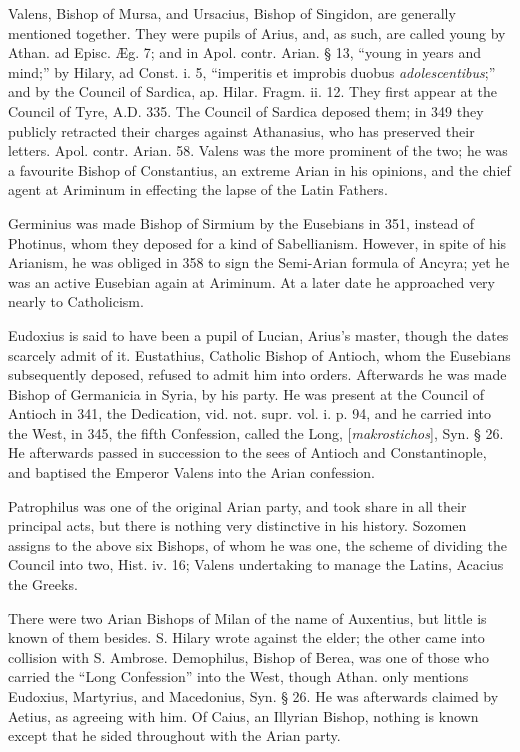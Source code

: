 Valens, Bishop of Mursa, and Ursacius, Bishop of
Singidon, are generally mentioned together. They were pupils of
Arius, and, as such, are called young by Athan. ad Episc. Æg. 7; and
in Apol. contr. Arian. § 13, ``young in years and mind;'' by Hilary, ad
Const. i. 5, ``imperitis et improbis duobus \emph{adolescentibus};'' and
by the Council of Sardica, ap. Hilar. Fragm. ii. 12. They first appear
at the Council of Tyre, A.D.
335. The Council of Sardica deposed them; in 349 they publicly
retracted their charges against Athanasius, who has preserved their
letters. Apol. contr. Arian. 58. Valens was the more prominent of the
two; he was a favourite Bishop of Constantius, an extreme Arian in his
opinions, and the chief agent at Ariminum in effecting the lapse of
the Latin Fathers.

Germinius was made Bishop of Sirmium by the
Eusebians in 351, instead of Photinus, whom they deposed for a kind of
Sabellianism. However, in spite of his Arianism, he was obliged in 358
to sign the Semi-Arian formula of Ancyra; yet he was an active
Eusebian again at Ariminum. At a later date he approached very nearly
to Catholicism.

Eudoxius is said to have been a pupil of Lucian,
Arius's master, though the dates scarcely admit of it. Eustathius,
Catholic Bishop of Antioch, whom the Eusebians subsequently deposed,
refused to admit him into orders. Afterwards he was made Bishop of
Germanicia in Syria, by his party. He was present at the Council of
Antioch in 341, the Dedication, vid. not. supr. vol. i. p. 94, and he
carried into the West, in 345, the fifth Confession, called the Long,
[\emph{makrostichos}], Syn. § 26. He afterwards passed in succession
to the sees of Antioch and Constantinople, and baptised the
Emperor Valens into the Arian confession.

Patrophilus was one of the original Arian party,
and took share in all their principal acts, but there is nothing very
distinctive in his history. Sozomen assigns to the above six Bishops,
of whom he was one, the scheme of dividing the Council into two, Hist.
iv. 16; Valens undertaking to manage the Latins, Acacius the Greeks.

There were two Arian Bishops of Milan of the name
of Auxentius, but little is known of them besides. S. Hilary wrote
against the elder; the other came into collision with S. Ambrose.
Demophilus, Bishop of Berea, was one of those who carried the ``Long
Confession'' into the West, though Athan. only mentions Eudoxius,
Martyrius, and Macedonius, Syn. § 26. He was afterwards claimed by
Aetius, as agreeing with him. Of Caius, an Illyrian Bishop, nothing is
known except that he sided throughout with the Arian party.

